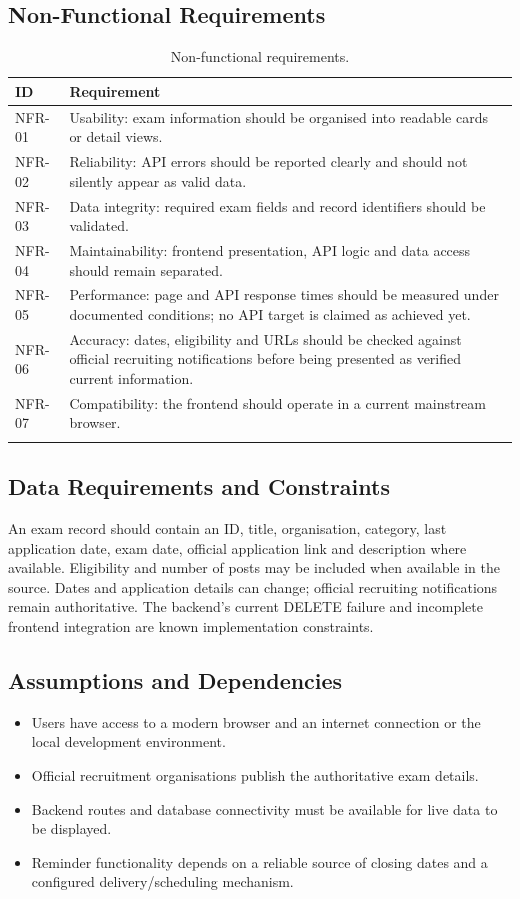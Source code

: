 \documentclass[12pt,a4paper]{report}
\begin{document}
\subsection{Non-Functional Requirements}
\begin{longtable}{p{} p{}}
\toprule\textbf{ID} & \textbf{Requirement}\\\midrule
NFR-01 & Usability: exam information should be organised into readable cards or detail views.\\
NFR-02 & Reliability: API errors should be reported clearly and should not silently appear as valid data.\\
NFR-03 & Data integrity: required exam fields and record identifiers should be validated.\\
NFR-04 & Maintainability: frontend presentation, API logic and data access should remain separated.\\
NFR-05 & Performance: page and API response times should be measured under documented conditions; no API target is claimed as achieved yet.\\
NFR-06 & Accuracy: dates, eligibility and URLs should be checked against official recruiting notifications before being presented as verified current information.\\
NFR-07 & Compatibility: the frontend should operate in a current mainstream browser.\\
\bottomrule
\caption{Non-functional requirements.}\label{tab:nfr}
\end{longtable}

\subsection{Data Requirements and Constraints}
An exam record should contain an ID, title, organisation, category, last application date, exam date, official application link and description where available. Eligibility and number of posts may be included when available in the source. Dates and application details can change; official recruiting notifications remain authoritative. The backend's current DELETE failure and incomplete frontend integration are known implementation constraints.

\subsection{Assumptions and Dependencies}
\begin{itemize}
\item Users have access to a modern browser and an internet connection or the local development environment.
\item Official recruitment organisations publish the authoritative exam details.
\item Backend routes and database connectivity must be available for live data to be displayed.
\item Reminder functionality depends on a reliable source of closing dates and a configured delivery/scheduling mechanism.
\end{itemize}
\end{document}
